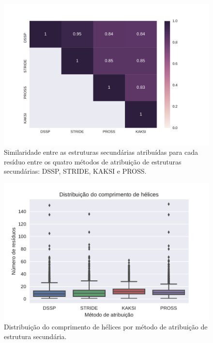 \begin{figure}
  \includegraphics[width=\linewidth]{../figures/comparacao_metodos_atribuicao.pdf}
  \caption{Similaridade entre as estruturas secundárias atribuídas para cada resíduo entre os quatro métodos de atribuição de estruturas secundárias: DSSP, STRIDE, KAKSI e PROSS.}
  \label{fig:comparacao_metodos_atribuicao}
\end{figure}


\begin{figure}
  \includegraphics[width=\linewidth]{../figures/distribuicao_comprimento_helices.pdf}
  \caption{Distribuição do comprimento de hélices por método de atribuição de estrutura secundária.}
  \label{fig:distribuicao_comprimento_helices}
\end{figure}


